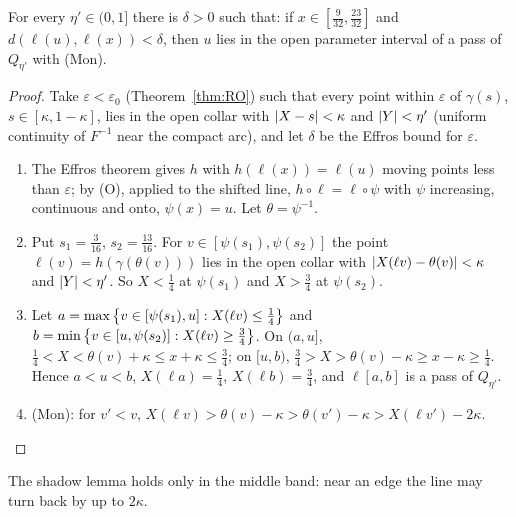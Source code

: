 
\begin{lemma}\label{lem:shadow}
For every $\eta'\in(0,1]$ there is $\delta>0$ such that: if $x\in[\frac9{32},\frac{23}{32}]$ and $d(\ell(u),\ell(x))<\delta$, then $u$ lies in the open
parameter interval of a pass of $Q_{\eta'}$ with (Mon).
\end{lemma}

\begin{proof}
Take $\varepsilon<\varepsilon_0$ (Theorem~\ref{thm:RO}) such that every point within $\varepsilon$ of $\gamma(s)$, $s\in[\kappa,1-\kappa]$, lies in the open collar with
$\left\lvert X-s\right\rvert<\kappa$ and $\left\lvert Y\right\rvert<\eta'$ (uniform continuity of $F^{-1}$ near the compact arc), and let $\delta$ be the Effros bound for $\varepsilon$.
\begin{enumerate}
\item The Effros theorem gives $h$ with $h(\ell(x))=\ell(u)$ moving points less than $\varepsilon$; by (O), applied to the shifted line, $h\circ\ell=\ell\circ\psi$
with $\psi$ increasing, continuous and onto, $\psi(x)=u$. Let $\theta=\psi^{-1}$.
\item Put $s_1=\frac3{16}$, $s_2=\frac{13}{16}$. For $v\in[\psi(s_1),\psi(s_2)]$ the point $\ell(v)=h(\gamma(\theta(v)))$ lies in the open collar with
$\left\lvert X(\ell v)-\theta(v)\right\rvert<\kappa$ and $\left\lvert Y\right\rvert<\eta'$. So $X<\frac14$ at $\psi(s_1)$ and $X>\frac34$ at $\psi(s_2)$.
\item Let $a=\max\left\{ v\in[\psi(s_1),u]:X(\ell v)\le\frac14 \right\}$ and $b=\min\left\{ v\in[u,\psi(s_2)]:X(\ell v)\ge\frac34 \right\}$. On $(a,u]$, $\frac14<X<\theta(v)+\kappa\le
x+\kappa\le\frac34$; on $[u,b)$, $\frac34>X>\theta(v)-\kappa\ge x-\kappa\ge\frac14$. Hence $a<u<b$, $X(\ell a)=\frac14$, $X(\ell b)=\frac34$, and
$\ell[a,b]$ is a pass of $Q_{\eta'}$.
\item (Mon): for $v'<v$, $X(\ell v)>\theta(v)-\kappa>\theta(v')-\kappa>X(\ell v')-2\kappa$.\qedhere
\end{enumerate}
\end{proof}


The shadow lemma holds only in the middle band: near an edge the line may turn back by up to $2\kappa$.

